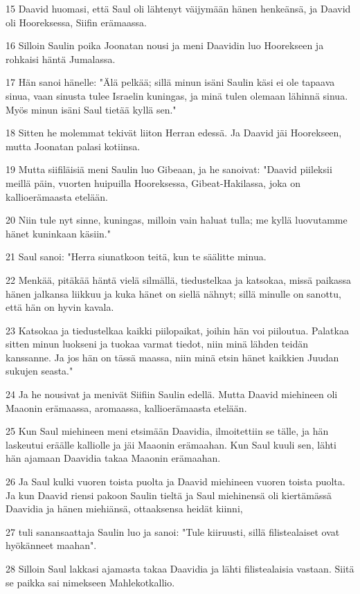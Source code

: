 \par 15 Daavid huomasi, että Saul oli lähtenyt väijymään hänen henkeänsä, ja Daavid oli Hooreksessa, Siifin erämaassa.
\par 16 Silloin Saulin poika Joonatan nousi ja meni Daavidin luo Hoorekseen ja rohkaisi häntä Jumalassa.
\par 17 Hän sanoi hänelle: "Älä pelkää; sillä minun isäni Saulin käsi ei ole tapaava sinua, vaan sinusta tulee Israelin kuningas, ja minä tulen olemaan lähinnä sinua. Myös minun isäni Saul tietää kyllä sen."
\par 18 Sitten he molemmat tekivät liiton Herran edessä. Ja Daavid jäi Hoorekseen, mutta Joonatan palasi kotiinsa.
\par 19 Mutta siifiläisiä meni Saulin luo Gibeaan, ja he sanoivat: "Daavid piileksii meillä päin, vuorten huipuilla Hooreksessa, Gibeat-Hakilassa, joka on kallioerämaasta etelään.
\par 20 Niin tule nyt sinne, kuningas, milloin vain haluat tulla; me kyllä luovutamme hänet kuninkaan käsiin."
\par 21 Saul sanoi: "Herra siunatkoon teitä, kun te säälitte minua.
\par 22 Menkää, pitäkää häntä vielä silmällä, tiedustelkaa ja katsokaa, missä paikassa hänen jalkansa liikkuu ja kuka hänet on siellä nähnyt; sillä minulle on sanottu, että hän on hyvin kavala.
\par 23 Katsokaa ja tiedustelkaa kaikki piilopaikat, joihin hän voi piiloutua. Palatkaa sitten minun luokseni ja tuokaa varmat tiedot, niin minä lähden teidän kanssanne. Ja jos hän on tässä maassa, niin minä etsin hänet kaikkien Juudan sukujen seasta."
\par 24 Ja he nousivat ja menivät Siifiin Saulin edellä. Mutta Daavid miehineen oli Maaonin erämaassa, aromaassa, kallioerämaasta etelään.
\par 25 Kun Saul miehineen meni etsimään Daavidia, ilmoitettiin se tälle, ja hän laskeutui eräälle kalliolle ja jäi Maaonin erämaahan. Kun Saul kuuli sen, lähti hän ajamaan Daavidia takaa Maaonin erämaahan.
\par 26 Ja Saul kulki vuoren toista puolta ja Daavid miehineen vuoren toista puolta. Ja kun Daavid riensi pakoon Saulin tieltä ja Saul miehinensä oli kiertämässä Daavidia ja hänen miehiänsä, ottaaksensa heidät kiinni,
\par 27 tuli sanansaattaja Saulin luo ja sanoi: "Tule kiiruusti, sillä filistealaiset ovat hyökänneet maahan".
\par 28 Silloin Saul lakkasi ajamasta takaa Daavidia ja lähti filistealaisia vastaan. Siitä se paikka sai nimekseen Mahlekotkallio.

